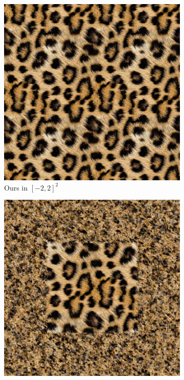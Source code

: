 \begin{figure}
    \centering
    \begin{subfigure}[b]{0.24\textwidth}
        \centering
        \includegraphics[width=\textwidth]{img/ch6/mnet_extrapolation.png}
        \caption{Ours in $[-2, 2]^2$}
        \label{f:periodic-leopard-regular}
    \end{subfigure}
    \begin{subfigure}[b]{0.24\textwidth}
        \centering
        \includegraphics[width=\textwidth]{img/ch6/siren_extrapolation.png}

\end{subfigure}
\end{figure}
